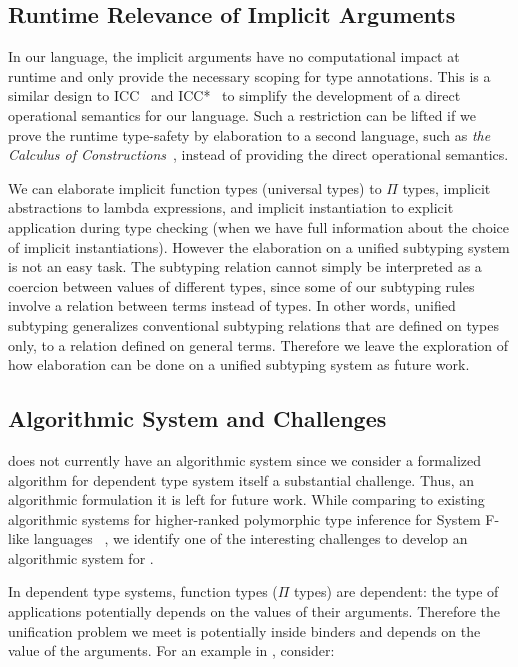 \subsection{Runtime Relevance of Implicit Arguments}

In our language, the implicit arguments have no computational impact at runtime
and only provide the necessary scoping for type annotations. This is
a similar design to ICC~\citep{miquel2001implicit} and
ICC*~\citep{barras2008implicit} to simplify the development of a direct
operational semantics for our language. Such a restriction can be lifted if we
prove the runtime type-safety by elaboration to a second language,
such as \emph{the Calculus of Constructions}~\citep{coc},
instead of providing the direct operational semantics.

We can elaborate implicit function types (universal types) to $\Pi$ types,
implicit abstractions to lambda expressions, and implicit instantiation to explicit
application during type checking (when we have full information about the
choice of implicit instantiations). However the elaboration on a unified subtyping
system is not an easy task. The subtyping relation cannot simply be interpreted
as a coercion between values of different types, since some of our subtyping
rules involve a relation between terms instead of types. In other words,
unified subtyping generalizes conventional subtyping relations that are defined
on types only, to a relation defined on general terms.
Therefore we leave the exploration of how elaboration can be done
on a unified subtyping system as future work.

\subsection{Algorithmic System and Challenges}

\name does not currently have an algorithmic system since we
consider a formalized algorithm for dependent type system itself a
substantial challenge. Thus, an algorithmic formulation it is left for future work.
While comparing to existing algorithmic systems
for higher-ranked polymorphic type inference for System F-like languages
~\citep{dunfield2013complete,zhao19mechanical},
we identify one of the interesting challenges to develop an algorithmic system for \name.

In dependent type systems, function types ($\Pi$ types) are dependent:
the type of applications potentially depends on the values of their arguments.
Therefore the unification problem we meet is potentially inside binders and
depends on the value of the arguments. For an example in \name, consider:


